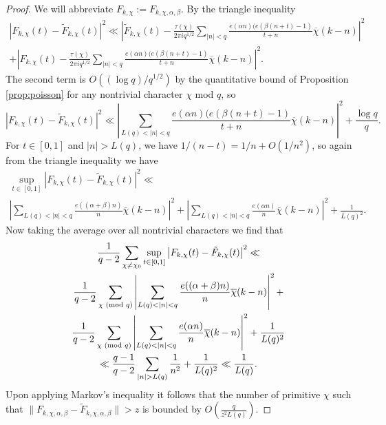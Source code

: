 \documentclass[12pt, a4paper]{amsart}
\theoremstyle{remark}
\newcommand{\abs}[1]{\left|#1\right|}
\renewcommand{\mod}[1]{{\ifmmode\text{\rm\ (mod~$#1$)}\else\discretionary{}{}{\hbox{ }}\rm(mod~$#1$)\fi}}
\newcommand{\chibar}{\overline \chi}
\begin{document}
\begin{proof}
    We will abbreviate $F_{k,\chi} := F_{k,\chi,\alpha,\beta}$.
    By the triangle inequality
    \begin{multline*}
        \abs{F_{k,\chi}(t) - \tilde F_{k,\chi}(t)}^2
        \ll \abs{\tilde F_{k,\chi}(t) -
            \frac{\tau(\chi)}{2 \pi i q^{1/2}} \sum_{\abs{n} < q}
    \frac{e(\alpha n)(e(\beta(n + t) - 1)}
        {t + n}\chibar(k - n)
            }^2 \\
            +
        \abs{F_{k,\chi}(t) -
            \frac{\tau(\chi)}{2 \pi i q^{1/2}} \sum_{\abs{n} < q}
    \frac{e(\alpha n)(e(\beta(n + t) - 1)}
        {t + n}\chibar(k - n)
            }^2.
    \end{multline*}
    The second term is $O((\log q)/q^{1/2})$ by the quantitative bound of
    Proposition \ref{prop:poisson} for any nontrivial character $\chi$ mod $q$,
    so
    \[
    \abs{F_{k,\chi}(t) - \tilde F_{k,\chi}(t)}^2
        \ll
            \abs{
            \sum_{L(q) < |n| < q}
            \frac{e(\alpha n)(e(\beta(n + t) - 1)}
            {t + n}
            \chibar(k - n)
        }^2 + \frac{\log q}{q}.
    \]
    For $t \in [0,1]$ and $|n| > L(q)$, we have $1/(n-t) = 1/n + O(1/n^2)$,
    so again from the triangle inequality we have
    \begin{multline}\label{eq:supbound}
        \sup_{t\in[0,1]} \abs{F_{k,\chi}(t) - \tilde F_{k,\chi}(t)}^2 \ll
        \\
            \abs{
            \sum_{L(q) < |n| < q}
            \frac{e((\alpha + \beta)n)}
            {n}
            \chibar(k - n)
        }^2 +
            \abs{
            \sum_{L(q) < |n| < q}
            \frac{e(\alpha n)}
            {n}
            \chibar(k - n)
        }^2
             + \frac{1}{L(q)^{2}}.
     \end{multline}
    Now taking the average over all nontrivial characters we find that
    \begin{multline*}
        \frac{1}{q-2}\sum_{\chi \ne \chi_0} \sup_{t\in[0,1]} \abs{F_{k,\chi}(t) - \tilde F_{k,\chi}(t)}^2 \ll \\
        \frac{1}{q-2}
        \sum_{\chi \mod q}
            \abs{
            \sum_{L(q) < |n| < q}
            \frac{e((\alpha + \beta)n)}
            {n}
            \chibar(k - n)
        }^2 + \\
        \frac{1}{q-2}
        \sum_{\chi \mod q}
            \abs{
            \sum_{L(q) < |n| < q}
            \frac{e(\alpha n)}
            {n}
            \chibar(k - n)
        }^2
        + \frac{1}{L(q)^{2}}
        \\
        \ll 
        \frac{q-1}{q-2}\sum_{|n| > L(q)} \frac{1}{n^2} + \frac{1}{L(q)^2}
        \ll
        \frac{1}{L(q)}.
    \end{multline*}
    Upon applying Markov's inequality it follows that the number of primitive $\chi$ such that
    $\|F_{k, \chi,\alpha,\beta} - \tilde F_{k, \chi,\alpha,\beta}\| > z$ is bounded by
    $O\left(\frac{q}{z^2 L(q)}\right)$.


\end{proof}
\end{document}

